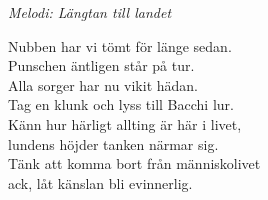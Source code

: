 {\footnotesize\textit{Melodi: Längtan till landet}}\par
\vspace{10pt}
Nubben har vi tömt för länge sedan.\\
Punschen äntligen står på tur.\\
Alla sorger har nu vikit hädan.\\
Tag en klunk och lyss till Bacchi lur.\\
Känn hur härligt allting är här i livet,\\
lundens höjder tanken närmar sig.\\
Tänk att komma bort från människolivet\\
ack, låt känslan bli evinnerlig.
